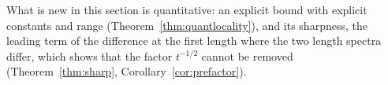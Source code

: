 What is new in this section is quantitative: an explicit bound with explicit constants and range
(Theorem~\ref{thm:quantlocality}), and its sharpness, the leading term of the difference at the
first length where the two length spectra differ, which shows that the factor $t^{-1/2}$ cannot be
removed (Theorem~\ref{thm:sharp}, Corollary~\ref{cor:prefactor}).



